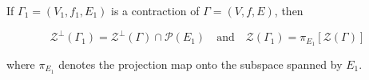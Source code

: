 If $\Gamma_1 = (V_1, f_1, E_1)$ is a contraction of $\Gamma = (V, f, E)$, then

$$\mathcal{Z}^\perp(\Gamma_1) = \mathcal{Z}^\perp(\Gamma) \cap \mathcal{P}(E_1) \quad \text{and} \quad \mathcal{Z}(\Gamma_1) = \pi_{E_1}[\mathcal{Z}(\Gamma)]$$

where $\pi_{E_1}$ denotes the projection map onto the subspace spanned by $E_1$.
